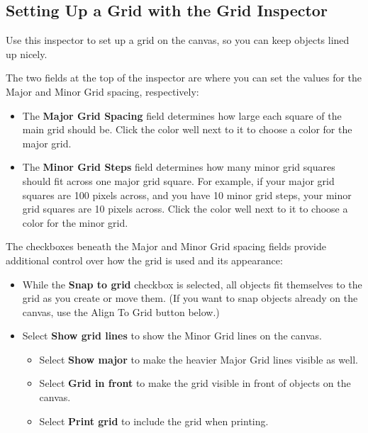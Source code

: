\documentclass[../main.tex]{subfiles}
\begin{document}
\subsection{Setting Up a Grid with the Grid Inspector}

Use this inspector to set up a grid on the canvas, so you can keep objects lined up nicely.


The two fields at the top of the inspector are where you can set the values for the Major and
Minor Grid spacing, respectively:

\begin{itemize}
  \item The \textbf{Major Grid Spacing} field determines how large each square of the main grid
    should be. Click the color well next to it to choose a color for the major grid.
  \item The \textbf{Minor Grid Steps} field determines how many minor grid squares should fit
    across one major grid square. For example, if your major grid squares are 100 pixels across,
    and you have 10 minor grid steps, your minor grid squares are 10 pixels across. Click the
    color well next to it to choose a color for the minor grid.
\end{itemize}

The checkboxes beneath the Major and Minor Grid spacing fields provide additional control over
how the grid is used and its appearance:

\begin{itemize}
  \item While the \textbf{Snap to grid} checkbox is selected, all objects fit themselves to the
    grid as you create or move them. (If you want to snap objects already on the canvas, use the
    Align To Grid button below.)
  \item Select \textbf{Show grid lines} to show the Minor Grid lines on the canvas.

    \begin{itemize}
      \item Select \textbf{Show major} to make the heavier Major Grid lines visible as well.
      \item Select \textbf{Grid in front} to make the grid visible in front of objects on the
        canvas.
      \item Select \textbf{Print grid} to include the grid when printing.
    \end{itemize}
\end{itemize}
\end{document}
